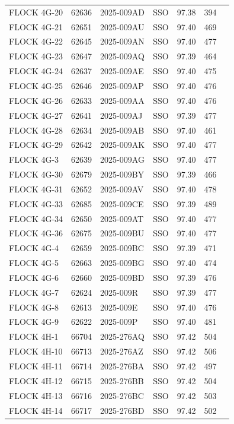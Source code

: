 \begin{longtable}{p{3.5cm}lllccc}
FLOCK 4G-20 & 62636 & 2025-009AD & SSO & 97.38 & 394 \\
FLOCK 4G-21 & 62651 & 2025-009AU & SSO & 97.40 & 469 \\
FLOCK 4G-22 & 62645 & 2025-009AN & SSO & 97.40 & 477 \\
FLOCK 4G-23 & 62647 & 2025-009AQ & SSO & 97.39 & 464 \\
FLOCK 4G-24 & 62637 & 2025-009AE & SSO & 97.40 & 475 \\
FLOCK 4G-25 & 62646 & 2025-009AP & SSO & 97.40 & 476 \\
FLOCK 4G-26 & 62633 & 2025-009AA & SSO & 97.40 & 476 \\
FLOCK 4G-27 & 62641 & 2025-009AJ & SSO & 97.39 & 477 \\
FLOCK 4G-28 & 62634 & 2025-009AB & SSO & 97.40 & 461 \\
FLOCK 4G-29 & 62642 & 2025-009AK & SSO & 97.40 & 477 \\
FLOCK 4G-3 & 62639 & 2025-009AG & SSO & 97.40 & 477 \\
FLOCK 4G-30 & 62679 & 2025-009BY & SSO & 97.39 & 466 \\
FLOCK 4G-31 & 62652 & 2025-009AV & SSO & 97.40 & 478 \\
FLOCK 4G-33 & 62685 & 2025-009CE & SSO & 97.39 & 489 \\
FLOCK 4G-34 & 62650 & 2025-009AT & SSO & 97.40 & 477 \\
FLOCK 4G-36 & 62675 & 2025-009BU & SSO & 97.40 & 477 \\
FLOCK 4G-4 & 62659 & 2025-009BC & SSO & 97.39 & 471 \\
FLOCK 4G-5 & 62663 & 2025-009BG & SSO & 97.40 & 474 \\
FLOCK 4G-6 & 62660 & 2025-009BD & SSO & 97.39 & 476 \\
FLOCK 4G-7 & 62624 & 2025-009R & SSO & 97.39 & 477 \\
FLOCK 4G-8 & 62613 & 2025-009E & SSO & 97.40 & 476 \\
FLOCK 4G-9 & 62622 & 2025-009P & SSO & 97.40 & 481 \\
FLOCK 4H-1 & 66704 & 2025-276AQ & SSO & 97.42 & 504 \\
FLOCK 4H-10 & 66713 & 2025-276AZ & SSO & 97.42 & 506 \\
FLOCK 4H-11 & 66714 & 2025-276BA & SSO & 97.42 & 497 \\
FLOCK 4H-12 & 66715 & 2025-276BB & SSO & 97.42 & 504 \\
FLOCK 4H-13 & 66716 & 2025-276BC & SSO & 97.42 & 503 \\
FLOCK 4H-14 & 66717 & 2025-276BD & SSO & 97.42 & 502 \\

\end{longtable}

